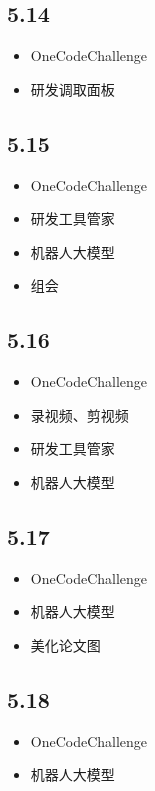 \documentclass[UTF8]{ctexart}
\begin{document}
\subsection*{5.14}
\begin{itemize}
    \item OneCodeChallenge
    \item 研发调取面板
\end{itemize}

\subsection*{5.15}
\begin{itemize}
    \item OneCodeChallenge
    \item 研发工具管家
    \item 机器人大模型
    \item 组会
\end{itemize}

\subsection*{5.16}
\begin{itemize}
    \item OneCodeChallenge
    \item 录视频、剪视频
    \item 研发工具管家
    \item 机器人大模型
\end{itemize}

\subsection*{5.17}
\begin{itemize}
    \item OneCodeChallenge
    \item 机器人大模型
    \item 美化论文图
\end{itemize}

\subsection*{5.18}
\begin{itemize}
    \item OneCodeChallenge
    \item 机器人大模型
\end{itemize}
\end{document}
